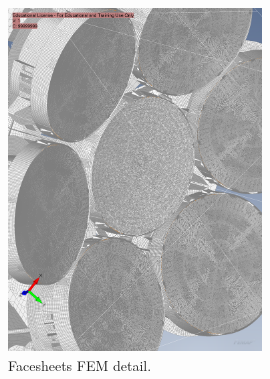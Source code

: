 \begin{figure}
  \centering
  \includegraphics[width=0.6\textwidth]{FEM/facesheets.png}
  \caption{Facesheets FEM detail.}
  \label{fig:fem-facesheets}
\end{figure}

